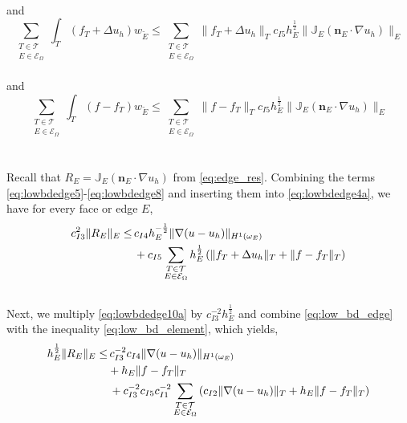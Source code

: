\\
and
\begin{equation} \label{eq:lowbdedge7}
\displaystyle\sum_{\substack{T \in \mathcal{T} \\E \in \mathcal{E}_\Omega}} \displaystyle\int_T (f_T + \Delta u_h) w_{\tilde{E}} \leq \displaystyle\sum_{\substack{T \in \mathcal{T} \\ E \in \mathcal{E}_\Omega}} \|f_T + \Delta u_h\|_T c_{I5}h_E^{\frac{1}{2}} \|\mathbb{J}_E(\mathbf{n}_E \cdot \nabla u_h)\|_E
\end{equation}
\\
and 
\begin{equation} \label{eq:lowbdedge8}
\displaystyle\sum_{\substack{T \in \mathcal{T} \\ E \in \mathcal{E}_\Omega}} \displaystyle\int_T (f-f_T)w_{\tilde{E}} \leq  \displaystyle\sum_{\substack{T \in \mathcal{T} \\ E \in \mathcal{E}_\Omega}} \|f-f_T\|_T c_{I5} h_E^{\frac{1}{2}} \|\mathbb{J}_E(\mathbf{n}_E \cdot \nabla u_h)\|_E
\end{equation}
\\
\\
Recall that $R_E = \mathbb{J}_E(\mathbf{n}_E \cdot \nabla u_h)$ from \eqref{eq:edge_res}. Combining the terms \eqref{eq:lowbdedge5}-\eqref{eq:lowbdedge8} and inserting them into \eqref{eq:lowbdedge4a}, we have for every face or edge $E$,
\begin{align} \label{eq:lowbdedge10a}
c_{I3}^{2}\|R_E\|_E \leq & \, c_{I4} h_E^{-\frac{1}{2}}\| \nabla (u-u_h) \|_{H^1(\omega_E)} \\
& \, + c_{I5}\displaystyle\sum_{\substack{T \in \mathcal{T} \\ E \in \mathcal{E}_\Omega}} h_E^{\frac{1}{2}} \left(\|f_T + \Delta u_h\|_T + \|f-f_T\|_T\right) \notag
\end{align}
\\
Next, we multiply \eqref{eq:lowbdedge10a} by $c_{I3}^{-2}h_E^{\frac{1}{2}}$ and combine \eqref{eq:low_bd_edge} with the inequality \eqref{eq:low_bd_element}, which yields,
\begin{align} \label{eq:low_bd_edge12}
h_E^{\frac{1}{2}} \|R_E\|_E \leq & \, c_{I3}^{-2}c_{I4} \| \nabla (u-u_h) \|_{H^1(\omega_E)} \\
& + h_E\|f-f_T\|_T \notag \\
& \, + c_{I3}^{-2}c_{I5}c_{I1}^{-2} \sum_{\substack{T \in \mathcal{T} \\ E \in \mathcal{E}_\Omega}} \left(c_{I2}\|\nabla(u-u_h)\|_T + h_E \|f-f_T\|_T \right) \notag
\end{align}
